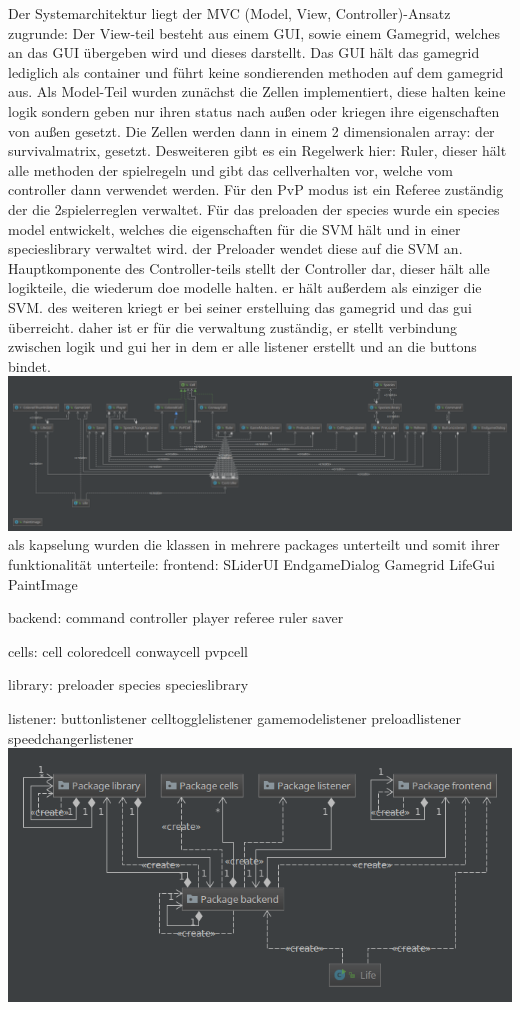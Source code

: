 \documentclass[12pt]{article}
\theoremstyle{plain}
\begin{document}
Der Systemarchitektur liegt der MVC (Model, View, Controller)-Ansatz zugrunde:
Der View-teil besteht aus einem GUI, sowie einem Gamegrid, welches an das GUI übergeben wird und dieses darstellt.
Das GUI hält das gamegrid lediglich als container und führt keine sondierenden methoden auf dem gamegrid aus.
Als Model-Teil wurden zunächst die Zellen implementiert, diese halten keine logik sondern geben nur ihren status nach außen oder kriegen ihre eigenschaften
von außen gesetzt. Die Zellen werden dann in einem 2 dimensionalen array: der survivalmatrix, gesetzt. Desweiteren gibt es ein Regelwerk hier: Ruler,
dieser hält alle methoden der spielregeln und gibt das cellverhalten vor, welche vom controller dann verwendet werden. Für den PvP modus ist ein Referee zuständig der die 2spielerreglen
verwaltet. Für das preloaden der species wurde ein species model entwickelt, welches die eigenschaften für die SVM hält und in einer specieslibrary verwaltet wird. der Preloader wendet diese auf die SVM an.
Hauptkomponente des Controller-teils stellt der Controller dar, dieser hält alle logikteile, die wiederum doe modelle halten. er hält außerdem als einziger die SVM.
des weiteren kriegt er bei seiner erstelluing das gamegrid und das gui überreicht. daher ist er für die verwaltung zuständig, er stellt verbindung zwischen logik und gui her in dem
er alle listener erstellt und an die buttons bindet.
\newline
\includegraphics{images/gogolClasses.png}
\newline
als kapselung wurden die klassen in mehrere packages unterteilt und somit ihrer funktionalität unterteile:
frontend:
SLiderUI
EndgameDialog
Gamegrid
LifeGui
PaintImage

backend:
command
controller
player
referee
ruler
saver

cells:
cell
coloredcell
conwaycell
pvpcell

library:
preloader
species
specieslibrary

listener:
buttonlistener
celltogglelistener
gamemodelistener
preloadlistener
speedchangerlistener
\newline
\includegraphics{images/gogolPackages.png}
\newline
\end{document}
